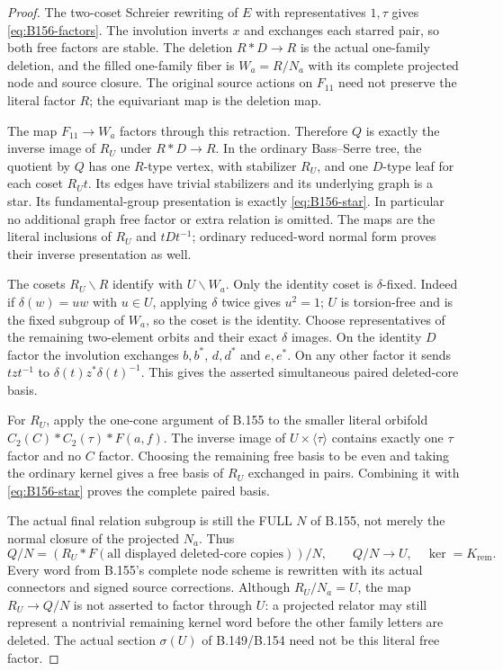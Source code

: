 \begin{proof}
The two-coset Schreier rewriting of $E$ with representatives $1,\tau$
gives \eqref{eq:B156-factors}. The involution inverts $x$ and exchanges
each starred pair, so both free factors are stable. The deletion
$R*D\to R$ is the actual one-family deletion, and the filled one-family
fiber is $W_a=R/N_a$ with its complete projected node and source
closure. The original source actions on $F_{11}$ need not preserve
the literal factor $R$; the equivariant map is the deletion map.

The map $F_{11}\to W_a$ factors through this retraction. Therefore $Q$
is exactly the inverse image of $R_U$ under $R*D\to R$.
In the ordinary Bass--Serre tree, the quotient by $Q$ has one
$R$-type vertex, with stabilizer $R_U$, and one $D$-type leaf for
each coset $R_Ut$. Its edges have trivial stabilizers and its
underlying graph is a star. Its fundamental-group presentation is
exactly \eqref{eq:B156-star}. In particular no additional graph
free factor or extra relation is omitted. The maps are the literal
inclusions of $R_U$ and $tDt^{-1}$; ordinary reduced-word normal
form proves their inverse presentation as well.

The cosets $R_U\backslash R$ identify with $U\backslash W_a$.
Only the identity coset is $\delta$-fixed. Indeed if
$\delta(w)=uw$ with $u\in U$, applying $\delta$ twice gives $u^2=1$;
$U$ is torsion-free and is the fixed subgroup of $W_a$, so the coset
is the identity. Choose representatives of the remaining two-element
orbits and their exact $\delta$ images. On the identity $D$ factor
the involution exchanges $b,b^*$, $d,d^*$ and $e,e^*$.
On any other factor it sends
$tzt^{-1}$ to $\delta(t)z^*\delta(t)^{-1}$.
This gives the asserted simultaneous paired deleted-core basis.

For $R_U$, apply the one-cone argument of B.155 to the smaller literal
orbifold $C_2(C)*C_2(\tau)*F(a,f)$. The inverse image of
$U\times\langle\tau\rangle$ contains exactly one $\tau$ factor and no
$C$ factor. Choosing the remaining free basis to be even and taking
the ordinary kernel gives a free basis of $R_U$ exchanged in pairs.
Combining it with \eqref{eq:B156-star} proves the complete paired basis.

The actual final relation subgroup is still the FULL $N$ of B.155,
not merely the normal closure of the projected $N_a$. Thus
\[
 Q/N=
 \left(R_U*F(\text{all displayed deleted-core copies})\right)/N,
 \qquad Q/N\longrightarrow U,\quad\ker=K_{\mathrm{rem}}.
\]
Every word from B.155's complete node scheme is rewritten with its
actual connectors and signed source corrections. Although
$R_U/N_a=U$, the map $R_U\to Q/N$ is not asserted to factor through
$U$: a projected relator may still represent a nontrivial remaining
kernel word before the other family letters are deleted. The actual
section $\sigma(U)$ of B.149/B.154 need not be this literal free factor.


\end{proof}
